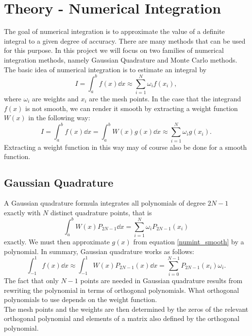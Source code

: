 \documentclass[notitlepage, reprint, nofootinbib]{revtex4-1}
\begin{document}
\section{Theory - Numerical Integration}
The goal of numerical integration is to approximate the value of a definite integral to a given degree of accuracy. There are many methods that can be used for this purpose. In this project we will focus on two families of numerical integration methods, namely Gaussian Quadrature and Monte Carlo methods.\\[2mm]
The basic idea of numerical integration is to estimate an integral by 
\begin{equation}\label{numint}I=\int_a^bf(x)\dd x \approx \sum_{i=1}^N\omega_i f(x_i),\end{equation}
where $\omega_i$ are weights and $x_i$ are the mesh points. In the case that the integrand $f(x)$ is not smooth, we can render it smooth by extracting a weight function $W(x)$ in the following way:
\begin{equation}\label{numint_smooth}I=\int_a^bf(x)\dd x=\int_a^bW(x)g(x)\dd x\approx \sum_{i=1}^N \omega_i g(x_i).\end{equation}
Extracting a weight function in this way may of course also be done for a smooth function.

\subsection{Gaussian Quadrature}
A Gaussian quadrature formula integrates all polynomials of degree $2N-1$ exactly with $N$ distinct quadrature points, that is 
\begin{equation}\label{gq1}\int_a^bW(x)P_{2N-1}\dd x=\sum_{i=1}^N\omega_iP_{2N-1}(x_i)\end{equation}
exactly. We must then approximate $g(x)$ from equation \ref{numint_smooth} by a polynomial. In summary, Gaussian quadrature works as follows: 
\begin{equation}\label{gq2}\int_{-1}^1 f(x)\dd x\approx\int_{-1}^1 W(x)P_{2N-1}(x)\dd x =\sum_{i=0}^{N-1} P_{2N-1}(x_i)\omega_i.\end{equation}
The fact that only $N-1$ points are needed in Gaussian quadrature results from rewriting the polynomial in terms of orthogonal polynomials\cite{lecture_notes}. What orthogonal polynomials to use depends on the weight function.  \\[2mm]
The mesh points and the weights are then determined by the zeros of the relevant orthogonal polynomial and elements of a matrix also defined by the orthogonal polynomial. 
\newpage
\end{document}

